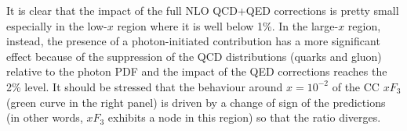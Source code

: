 
It is clear that the impact of the full NLO QCD+QED corrections is
pretty small especially in the low-$x$ region where it is well below
1\%.
%
In the large-$x$ region, instead, the presence of a
photon-initiated contribution has a more significant effect because of
the suppression of the QCD distributions (quarks and gluon) relative
to the photon PDF and the impact of the QED corrections reaches the
2\% level.
%
It should be stressed that the behaviour around
$x=10^{-2}$ of the CC $xF_3$ (green curve in the right panel) is driven
by a change of sign of the predictions (in other words,
$xF_3$ exhibits a node in this region) so that the ratio diverges.

